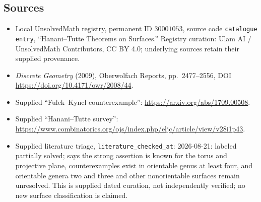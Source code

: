 \documentclass[11pt]{article}
\begin{document}
\subsection{Sources}
\begin{itemize}
\item Local UnsolvedMath registry, permanent ID \(30001053\), source code \texttt{catalogue entry}, ``Hanani--Tutte Theorems on Surfaces.'' Registry curation: Ulam AI / UnsolvedMath Contributors, CC BY 4.0; underlying sources retain their supplied provenance.
\item \emph{Discrete Geometry} (2009), Oberwolfach Reports, pp.\ 2477--2556, DOI \url{https://doi.org/10.4171/owr/2008/44}.
\item Supplied ``Fulek--Kyncl counterexample'': \url{https://arxiv.org/abs/1709.00508}.
\item Supplied ``Hanani--Tutte survey'': \url{https://www.combinatorics.org/ojs/index.php/eljc/article/view/v28i1p43}.
\item Supplied literature triage, \texttt{literature\_checked\_at}: 2026-08-21: labeled partially solved; says the strong assertion is known for the torus and projective plane, counterexamples exist in orientable genus at least four, and orientable genera two and three and other nonorientable surfaces remain unresolved. This is supplied dated curation, not independently verified; no new surface classification is claimed.
\end{itemize}
\end{document}
